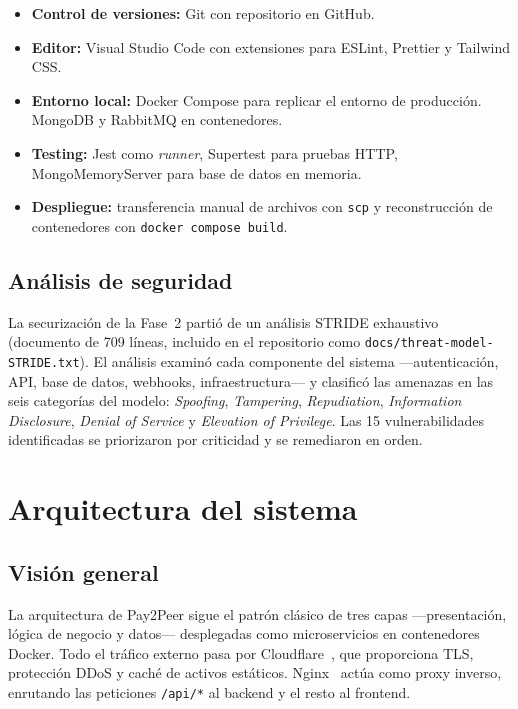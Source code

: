\begin{itemize}
  \item \textbf{Control de versiones:} Git con repositorio en GitHub.
  \item \textbf{Editor:} Visual Studio Code con extensiones para ESLint, Prettier y Tailwind CSS.
  \item \textbf{Entorno local:} Docker Compose para replicar el entorno de producción. MongoDB y RabbitMQ en contenedores.
  \item \textbf{Testing:} Jest como \emph{runner}, Supertest para pruebas HTTP, MongoMemoryServer para base de datos en memoria.
  \item \textbf{Despliegue:} transferencia manual de archivos con \texttt{scp} y reconstrucción de contenedores con \texttt{docker compose build}.
\end{itemize}

\section{Análisis de seguridad}

La securización de la Fase~2 partió de un análisis STRIDE exhaustivo (documento de 709 líneas, incluido en el repositorio como \texttt{docs/threat-model-STRIDE.txt}). El análisis examinó cada componente del sistema ---autenticación, API, base de datos, webhooks, infraestructura--- y clasificó las amenazas en las seis categorías del modelo: \emph{Spoofing}, \emph{Tampering}, \emph{Repudiation}, \emph{Information Disclosure}, \emph{Denial of Service} y \emph{Elevation of Privilege}. Las 15 vulnerabilidades identificadas se priorizaron por criticidad y se remediaron en orden.

\chapter{Arquitectura del sistema}\label{ch:arquitectura}

\section{Visión general}

La arquitectura de Pay2Peer sigue el patrón clásico de tres capas ---presentación, lógica de negocio y datos--- desplegadas como microservicios en contenedores Docker. Todo el tráfico externo pasa por Cloudflare~\cite{cloudflare}, que proporciona TLS, protección DDoS y caché de activos estáticos. Nginx~\cite{nginx} actúa como proxy inverso, enrutando las peticiones \texttt{/api/*} al backend y el resto al frontend.

